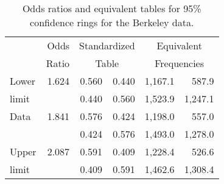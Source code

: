\begin{table}[htb]
\caption{Odds ratios and equivalent tables for 95\% confidence rings for the Berkeley data.}\label{tab:berkodds}
 \begin{center}
\begin{tabular}{lr|rr|rr}
\hline
   &      Odds    & \multicolumn{2}{c|}{Standardized} & \multicolumn{2}{c}{Equivalent}  \\
   &      Ratio   & \multicolumn{2}{c|}{Table}   &  \multicolumn{2}{c}{Frequencies} \\
\hline
%
%
Lower  &   1.624   &   0.560  & 0.440   & 1,167.1  & 587.9  \\ 
limit  &           &   0.440  & 0.560   & 1,523.9  & 1,247.1 \\[2ex]
Data   &   1.841   &   0.576  & 0.424   & 1,198.0  & 557.0  \\ 
       &           &   0.424  & 0.576   & 1,493.0  & 1,278.0  \\[2ex] 
Upper  &   2.087   &   0.591  & 0.409   & 1,228.4  & 526.6   \\ 
limit  &           &   0.409  & 0.591   & 1,462.6  & 1,308.4  \\ 
\hline
\end{tabular}
\end{center}
\end{table}
